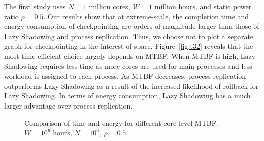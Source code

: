 The first study uses $N=1$ million cores, %
$W=1$ million hours, and static power ratio $\rho=0.5$.
Our results show that at extreme-scale, the completion time and energy consumption of checkpointing are orders of magnitude larger than those of Lazy Shadowing and process replication. Thus, we choose not to plot a separate graph for checkpointing in the interest of space. 
Figure~\ref{fig:t32} reveals that the most time efficient choice largely depends on MTBF. 
When MTBF is high, Lazy Shadowing requires less time as more cores are used for main processes and less workload is assigned to each process. As MTBF decreases, process replication outperforms Lazy Shadowing as a result of the increased likelihood of rollback for Lazy Shadowing.
In terms of energy consumption, Lazy Shadowing has a much larger advantage over process replication. %

\begin{figure}[!t]
	\captionsetup{justification=centering}
	\begin{center} 
		\caption{Comparison of time and energy for different core level MTBF. $W=10^6$ hours, $N=10^6$, $\rho=0.5$.}
	\end{center}
	\label{fig:com3}
\end{figure}

